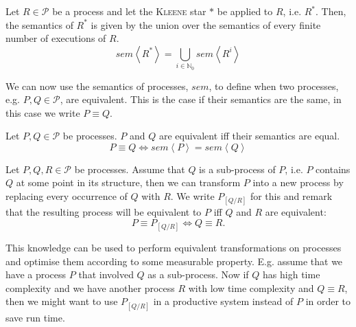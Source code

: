 \begin{definition}
\label{def:sem_kleene_alternative}
  Let $R \in \mathcal{P}$ be a process and let the \textsc{Kleene} star $*$ be applied to $R$, i.e. $R^*$. Then, the semantics of $R^*$ is given by the union over the semantics of every finite number of executions of $R$.
  \begin{equation}
    \label{eqn:sem_kleene_alternative}
    sem \left\langle R^* \right\rangle = \bigcup_{i \in \mathbb{N}_0} sem \left\langle R^i \right\rangle
  \end{equation}
  \hfill\qedsymbol
\end{definition}


We can now use the semantics of processes, $sem$, to define when two processes, e.g. $P, Q \in \mathcal{P}$, are equivalent. This is the case if their semantics are the same, in this case we write $P \equiv Q$.
\begin{definition}
Let $P, Q \in \mathcal{P}$ be processes. $P$ and $Q$ are equivalent iff their semantics are equal.
  \begin{equation}
    \label{eqn:equivalence}
    P \equiv Q \Leftrightarrow sem \left\langle P \right\rangle = sem \left\langle Q \right\rangle
  \end{equation}
  \hfill\qedsymbol
\end{definition}

Let $P, Q, R \in \mathcal{P}$ be processes. Assume that $Q$ is a sub-process of $P$, i.e. $P$ contains $Q$ at some point in its structure, then we can transform $P$ into a new process by replacing every occurrence of $Q$ with $R$. We write $P_{\left[ Q / R \right]}$ for this and remark that the resulting process will be equivalent to $P$ iff $Q$ and $R$ are equivalent:
\begin{equation}
  P \equiv P_{\left[ Q / R \right]} \Leftrightarrow Q \equiv R.
\end{equation}

This knowledge can be used to perform equivalent transformations on processes and optimise them according to some measurable property. E.g. assume that we have a process $P$ that involved $Q$ as a sub-process. Now if $Q$ has high time complexity and we have another process $R$ with low time complexity and $Q \equiv R$, then we might want to use $P_{\left[ Q / R \right]}$ in a productive system instead of $P$ in order to save run time.

